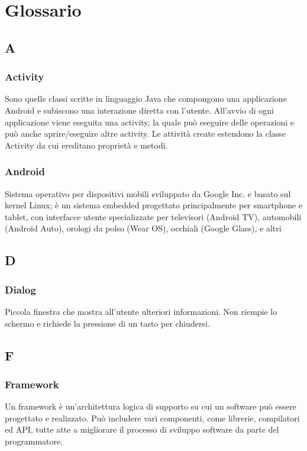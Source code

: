 \section{Glossario}
\subsection*{A}
\subsubsection*{Activity}
Sono quelle classi scritte in linguaggio Java che compongono una applicazione Android e subiscono
una interazione diretta con l'utente. All'avvio di ogni applicazione viene eseguita una activity, la
quale può eseguire delle operazioni e può anche aprire/eseguire altre activity. Le attività create
estendono la classe Activity da cui ereditano proprietà e metodi.

\subsubsection*{Android}
Sistema operativo per dispositivi mobili sviluppato da Google Inc. e basato sul kernel Linux; è
un sistema embedded progettato principalmente per smartphone e tablet, con interfacce utente
specializzate per televisori (Android TV), automobili (Android Auto), orologi da polso (Wear
OS), occhiali (Google Glass), e altri

\subsection*{D}
\subsubsection*{Dialog}
Piccola finestra che mostra all'utente ulteriori informazioni. Non riempie lo schermo e richiede la pressione di un tasto per chiudersi.

\subsection*{F}
\subsubsection*{Framework}
Un framework è un'architettura logica di supporto su cui un software può essere progettato e
realizzato. Può includere vari componenti, come librerie, compilatori ed API, tutte atte a
migliorare il processo di sviluppo software da parte del programmatore.

